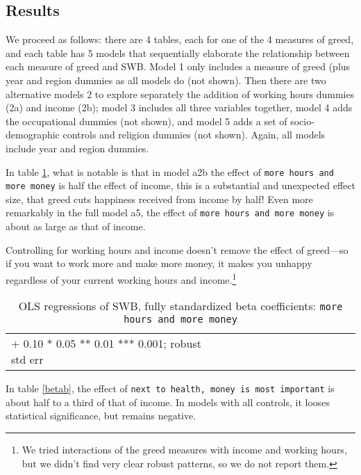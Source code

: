 \documentclass[10pt, letterpaper]{article}
\begin{document}
\begin{spacing}{1.8}
\section{Results}

We proceed as follows: there are 4 tables, each for one of the 4  measures of
greed, and each table has 5 models that sequentially elaborate the relationship between each measure of greed and SWB. Model 1 only includes a measure of greed (plus year and region dummies as all models do (not shown). Then there are two
alternative models 2 to explore separately the addition of working hours dummies (2a)
and income (2b); model 3 includes all three variables together, model 4 adds the occupational dummies (not shown), and model 5 adds a set of socio-demographic
controls and religion dummies (not shown). 
Again, all models include year and region dummies.
 
In table \ref{betaa}, what is notable is that in model a2b the effect of \texttt{more hours and more money} is half the effect of income, this is a substantial and unexpected effect size, that greed cuts happiness received from income by half! Even more remarkably in the full model a5, the effect of \texttt{more hours and more money} is about as large as that of income.

Controlling for working hours and income doesn't remove the effect of greed---so
if you want to work more and make more money, it makes you unhappy regardless of your current working hours and
income.\footnote{We tried interactions of the greed measures with income and working hours, but we didn't find very clear robust patterns, so we do not report them.}


\begin{spacing}{.9} \begin{table}[H]\centering   \begin{scriptsize} \begin{tabular}{p{1.8in}p{.5in}p{.5in}p{.5in}p{.5in}p{.5in}p{.5in}p{.5in}p{.5in}p{.5in}p{.5 in}p{.5in}p{.5 in}}\hline  \hline + 0.10 * 0.05 ** 0.01 *** 0.001; robust std err \end{tabular}\end{scriptsize}\caption{\label{betaa}OLS regressions of SWB, fully standardized beta coefficients: \texttt{more hours and more money}}\end{table} \end{spacing}
 
In table \ref{betab}, the effect of \texttt{next to  health, money is most important} is about half to a third of that of income. In models with all controls, it looses statistical significance, but remains negative. 


\end{spacing}
\end{document}

